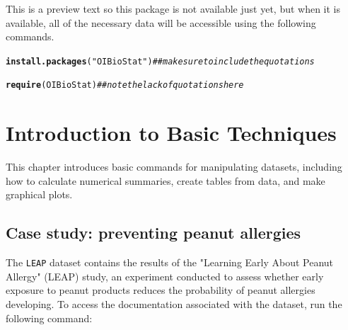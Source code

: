 \documentclass{report}\usepackage[]{graphicx}\usepackage[]{color}
\makeatletter
\newcommand{\hlstr}[1]{\textcolor[rgb]{0.192,0.494,0.8}{#1}}%
\newcommand{\hlcom}[1]{\textcolor[rgb]{0.678,0.584,0.686}{\textit{#1}}}%
\newcommand{\hlstd}[1]{\textcolor[rgb]{0.345,0.345,0.345}{#1}}%
\newcommand{\hlkwd}[1]{\textcolor[rgb]{0.737,0.353,0.396}{\textbf{#1}}}%
\newenvironment{kframe}{%
 \def\at@end@of@kframe{}%
 \ifinner\ifhmode%
  \def\at@end@of@kframe{\end{minipage}}%
  \begin{minipage}{\columnwidth}%
 \fi\fi%
 \def\FrameCommand##1{\hskip\@totalleftmargin \hskip-\fboxsep
 \colorbox{shadecolor}{##1}\hskip-\fboxsep
     \hskip-\linewidth \hskip-\@totalleftmargin \hskip\columnwidth}%
 \MakeFramed {\advance\hsize-\width
   \@totalleftmargin\z@ \linewidth\hsize
   \@setminipage}}%
 {\par\unskip\endMakeFramed%
 \at@end@of@kframe}
\newenvironment{knitrout}{}{} %
\makeatother
\begin{document}
This is a preview text so this package is not available just yet, but when it is available, all of the necessary data will be accessible using the following commands.  
\begin{knitrout}
\color{fgcolor}\begin{kframe}
\begin{alltt}
\hlkwd{install.packages}\hlstd{(}\hlstr{"OIBioStat"}\hlstd{)}  \hlcom{## make sure to include the quotations}
\end{alltt}
\end{kframe}
\end{knitrout}
\begin{knitrout}
\color{fgcolor}\begin{kframe}
\begin{alltt}
\hlkwd{require}\hlstd{(OIBioStat)} \hlcom{## note the lack of quotations here}
\end{alltt}
\end{kframe}
\end{knitrout}

\newpage 
\chapter{Introduction to Basic Techniques}
\minitoc

\vspace{0.5cm} 

This chapter introduces basic commands for manipulating datasets, including how to calculate numerical summaries, create tables from data, and make graphical plots. 

\section{Case study: preventing peanut allergies}

The \texttt{LEAP} dataset contains the results of the "Learning Early About Peanut Allergy" (LEAP) study, an experiment conducted to assess whether early exposure to peanut products reduces the probability of peanut allergies developing. To access the documentation associated with the dataset, run the following command: 
\end{document}
